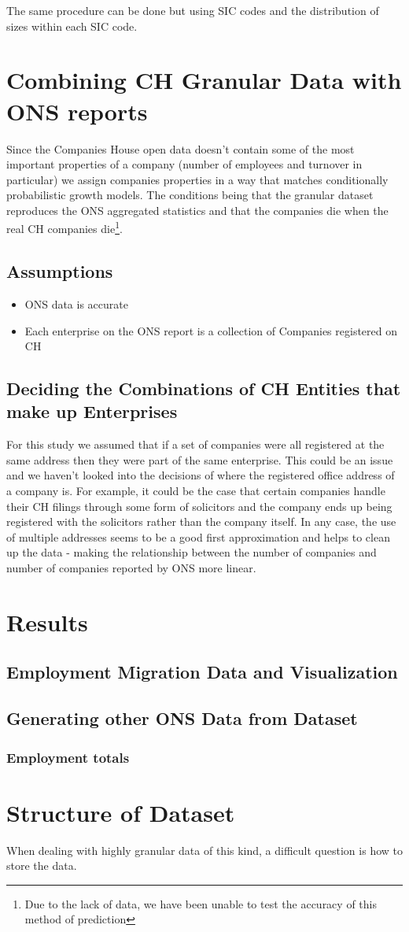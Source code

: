 \documentclass[a4paper,10pt]{article}
\begin{document}
The same procedure can be done but using SIC codes and the distribution of sizes within each SIC code.

\section{Combining CH Granular Data with ONS reports}
Since the Companies House open data doesn't contain some of the most important properties of a company (number of employees and turnover in particular) we assign companies properties in a way that matches conditionally probabilistic growth models. The conditions being that the granular dataset reproduces the ONS aggregated statistics and that the companies die when the real CH companies die\footnote{Due to the lack of data, we have been unable to test the accuracy of this method of prediction}.
\subsection{Assumptions}

\begin{itemize}
 \item ONS data is accurate
 \item Each enterprise on the ONS report is a collection of Companies registered on CH
\end{itemize}

\subsection{Deciding the Combinations of CH Entities that make up Enterprises}
For this study we assumed that if a set of companies were all registered at the same address then they were part of the same enterprise. This could be an issue and we haven't looked into the decisions of where the registered office address of a company is. For example, it could be the case that certain companies handle their CH filings through some form of solicitors and the company ends up being registered with the solicitors rather than the company itself. In any case, the use of multiple addresses seems to be a good first approximation and helps to clean up the data - making the relationship between the number of companies and number of companies reported by ONS more linear.




\section{Results}

\subsection{Employment Migration Data and Visualization}
\subsection{Generating other ONS Data from Dataset}
\subsubsection{Employment totals}

\section{Structure of Dataset}
When dealing with highly granular data of this kind, a difficult question is how to store the data.
\end{document}

